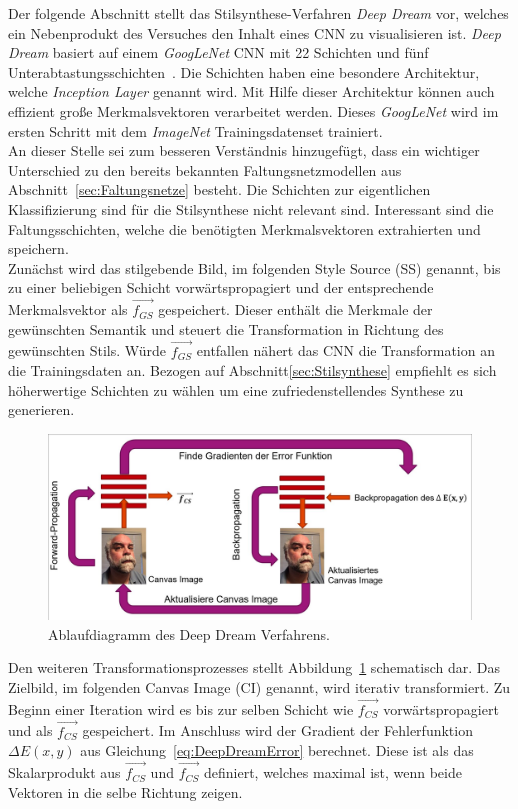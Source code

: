 \documentclass[times, 11pt,twocolumn]{article}
\begin{document}
 \label{sec:DeepDream}
Der folgende Abschnitt stellt das Stilsynthese-Verfahren \textit{Deep Dream} \cite{DeepDream} vor, welches ein Nebenprodukt des Versuches den Inhalt eines CNN zu visualisieren ist. \textit{Deep Dream} basiert auf einem \textit{GoogLeNet} CNN mit 22 Schichten und fünf Unterabtastungsschichten~\cite{Szegedy_2015_CVPR}. Die Schichten haben eine besondere Architektur, welche \textit{Inception Layer} genannt wird. Mit Hilfe dieser Architektur können auch effizient große Merkmalsvektoren verarbeitet werden. Dieses \textit{GoogLeNet} wird im ersten Schritt mit dem \textit{\textit{ImageNet}} Trainingsdatenset trainiert.\\
An dieser Stelle sei zum besseren Verständnis hinzugefügt, dass ein wichtiger Unterschied zu den bereits bekannten Faltungsnetzmodellen aus Abschnitt~\ref{sec:Faltungsnetze} besteht. Die Schichten zur eigentlichen Klassifizierung sind für die Stilsynthese nicht relevant sind. Interessant sind die Faltungsschichten, welche die benötigten Merkmalsvektoren extrahierten und speichern.\\
Zunächst wird das stilgebende Bild, im folgenden Style Source (SS) genannt, bis zu einer beliebigen Schicht vorwärtspropagiert und der entsprechende Merkmalsvektor als $\vec{f_{GS}}$ gespeichert. Dieser enthält die Merkmale der gewünschten Semantik und steuert die Transformation in Richtung des gewünschten Stils. Würde $\vec{f_{GS}}$ entfallen nähert das CNN die Transformation an die Trainingsdaten an.  Bezogen auf Abschnitt\ref{sec:Stilsynthese} empfiehlt es sich höherwertige Schichten zu wählen um eine zufriedenstellendes Synthese zu generieren.\\
\begin{figure}
	\flushleft
	\includegraphics[width=\columnwidth]{Bilder/DeepDream.jpg}
	\caption{Ablaufdiagramm des Deep Dream Verfahrens.}
	\label{fig:DeepDream}
\end{figure}
Den weiteren Transformationsprozesses stellt Abbildung~\ref{fig:DeepDream} schematisch dar. Das Zielbild, im folgenden Canvas Image (CI) genannt, wird iterativ transformiert. Zu Beginn einer Iteration wird es bis zur selben Schicht wie $\vec{f_{CS}}$ vorwärtspropagiert und als $\vec{f_{CS}}$ gespeichert. Im Anschluss wird der Gradient der Fehlerfunktion $\Delta E(x,y)$ aus Gleichung~\ref{eq:DeepDreamError} berechnet. Diese ist als das Skalarprodukt aus $\vec{f_{CS}}$ und $\vec{f_{CS}}$ definiert, welches maximal ist, wenn beide Vektoren in die selbe Richtung zeigen.
\end{document}
